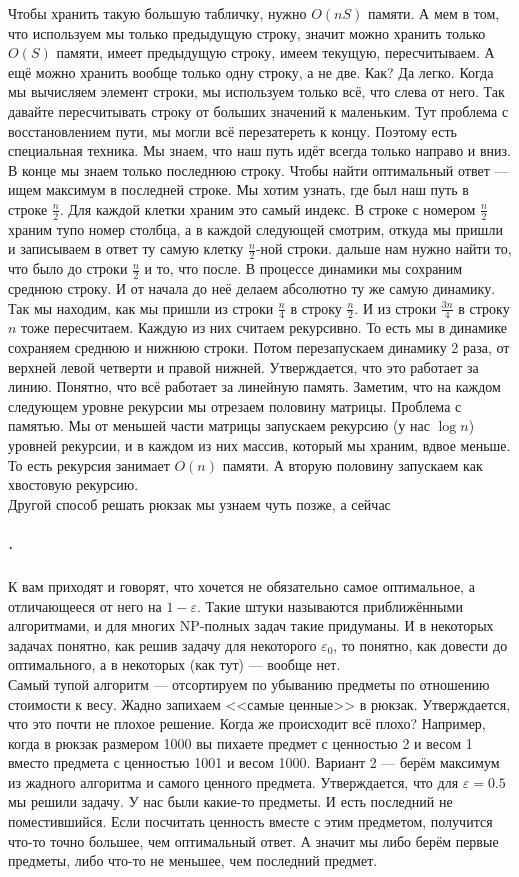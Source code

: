\documentclass{article}
\begin{document}
    Чтобы хранить такую большую табличку, нужно $O(nS)$ памяти. А мем в том, что используем мы только предыдущую строку, значит можно хранить только $O(S)$ памяти, имеет предыдущую строку, имеем текущую, пересчитываем. А ещё можно хранить вообще только одну строку, а не две. Как? Да легко. Когда мы вычисляем элемент строки, мы используем только всё, что слева от него. Так давайте пересчитывать строку от больших значений к маленьким. Тут проблема с восстановлением пути, мы могли всё перезатереть к концу. Поэтому есть специальная техника. Мы знаем, что наш путь идёт всегда только направо и вниз. В конце мы знаем только последнюю строку. Чтобы найти оптимальный ответ --- ищем максимум в последней строке. Мы хотим узнать, где был наш путь в строке $\frac n2$. Для каждой клетки храним это самый индекс. В строке с номером $\frac n2$ храним тупо номер столбца, а в каждой следующей смотрим, откуда мы пришли и записываем в ответ ту самую клетку $\frac n2$-ной строки. дальше нам нужно найти то, что было до строки $\frac n2$ и то, что после. В процессе динамики мы сохраним среднюю строку. И от начала до неё делаем абсолютно ту же самую динамику. Так мы находим, как мы пришли из строки $\frac n4$ в строку $\frac n2$. И из строки $\frac{3n}4$ в строку $n$ тоже пересчитаем. Каждую из них считаем рекурсивно. То есть мы в динамике сохраняем среднюю и нижнюю строки. Потом перезапускаем динамику 2 раза, от верхней левой четверти и правой нижней. Утверждается, что это работает за линию. Понятно, что всё работает за линейную память. Заметим, что на каждом следующем уровне рекурсии мы отрезаем половину матрицы. Проблема с памятью. Мы от меньшей части матрицы запускаем рекурсию (у нас $\log n$) уровней рекурсии, и в каждом из них массив, который мы храним, вдвое меньше. То есть рекурсия занимает $O(n)$ памяти. А вторую половину запускаем как хвостовую рекурсию.\\
    Другой способ решать рюкзак мы узнаем чуть позже, а сейчас
    \subparagraph{.}
    К вам приходят и говорят, что хочется не обязательно самое оптимальное, а отличающееся от него на $1-\varepsilon$. Такие штуки называются приближёнными алгоритмами, и для многих NP-полных задач такие придуманы. И в некоторых задачах понятно, как решив задачу для некоторого $\varepsilon_0$, то понятно, как довести до оптимального, а в некоторых (как тут) --- вообще нет.\\
    Самый тупой алгоритм --- отсортируем по убыванию предметы по отношению стоимости к весу. Жадно запихаем <<самые ценные>> в рюкзак. Утверждается, что это почти не плохое решение. Когда же происходит всё плохо? Например, когда в рюкзак размером 1000 вы пихаете предмет с ценностью 2 и весом 1 вместо предмета с ценностью 1001 и весом 1000. Вариант 2 --- берём максимум из жадного алгоритма и самого ценного предмета. Утверждается, что для $\varepsilon=0.5$ мы решили задачу. У нас были какие-то предметы. И есть последний не поместившийся. Если посчитать ценность вместе с этим предметом, получится что-то точно большее, чем оптимальный ответ. А значит мы либо берём первые предметы, либо что-то не меньшее, чем последний предмет.\\
\end{document}
